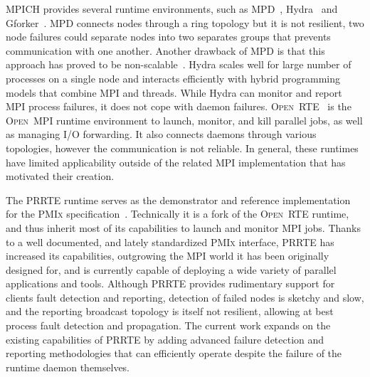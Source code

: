 \documentclass[sigconf]{acmart}
\newcommand{\prrte}[0]{\textsc{PRRTE}\xspace}
\newcommand{\pmix}[0]{\textsc{PMIx}\xspace}
\newcommand{\orte}[0]{\textsc{Open~RTE}\xspace}
\newcommand{\ompi}[0]{\textsc{Open~MPI}\xspace}
\newcommand{\mpi}[0]{\textsc{MPI}\xspace}
\begin{document}
MPICH provides several runtime environments, such as MPD~\cite{Butler00}, Hydra~\cite{MPICH14} and Gforker~\cite{MPICH14}. MPD connects nodes through a ring topology but it is not resilient, two node failures could separate nodes into two separates groups that prevents communication with one another. Another drawback of MPD is that this approach has proved to be non-scalable~\cite{Bosilca11}.
Hydra scales well for large number of processes on a single node and interacts efficiently with hybrid programming models that combine \mpi and threads. While Hydra can monitor
and report MPI process failures, it does not cope with daemon failures.
%
\orte~\cite{Castain05, Jeffrey12} is the \ompi runtime environment to launch, monitor, and kill parallel jobs, as well as managing I/O forwarding. It also connects daemons through various topologies, however the communication is not reliable. In general, these runtimes have limited applicability outside of the related \mpi implementation that has motivated their creation.

The \prrte runtime serves as the demonstrator and reference implementation
for the \pmix specification~\cite{CASTAIN18}. Technically it is a fork of
the \orte runtime, and thus inherit most of its capabilities to launch
and monitor \mpi jobs. Thanks to a well documented, and lately standardized \pmix interface, \prrte
has increased its capabilities, outgrowing the MPI world it has been originally designed for, and is currently capable of
deploying a wide variety of parallel applications and tools.
Although \prrte provides rudimentary support for clients fault detection and reporting,
detection of failed nodes is sketchy and slow, and the reporting
broadcast topology is itself not resilient, allowing at best process fault detection and propagation.
The current work expands on the existing capabilities of \prrte by adding
advanced failure detection and reporting methodologies that can efficiently operate
despite the failure of the runtime daemon themselves.
\end{document}
